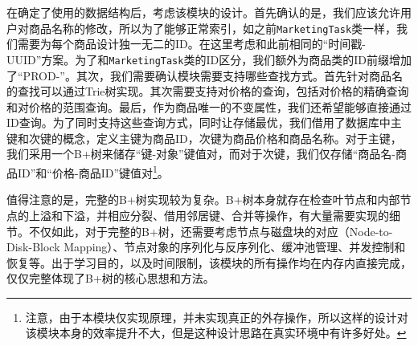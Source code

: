 \documentclass[cn,hazy,blue,10pt,normal]{elegantnote}
\begin{document}
在确定了使用的数据结构后，考虑该模块的设计。首先确认的是，我们应该允许用户对商品名称的修改，所以为了能够正常索引，如之前\texttt{MarketingTask}类一样，我们需要为每个商品设计独一无二的ID。在这里考虑和此前相同的“时间戳-UUID”方案。为了和\texttt{MarketingTask}类的ID区分，我们额外为商品类的ID前缀增加了“PROD-”。其次，我们需要确认模块需要支持哪些查找方式。首先针对商品名的查找可以通过Trie树实现。其次需要支持对价格的查询，包括对价格的精确查询和对价格的范围查询。最后，作为商品唯一的不变属性，我们还希望能够直接通过ID查询。为了同时支持这些查询方式，同时让存储最优，我们借用了数据库中主键和次键的概念，定义主键为商品ID，次键为商品价格和商品名称。对于主键，我们采用一个B+树来储存“键-对象”键值对，而对于次键，我们仅存储“商品名-商品ID”和“价格-商品ID”键值对\footnote{注意，由于本模块仅实现原理，并未实现真正的外存操作，所以这样的设计对该模块本身的效率提升不大，但是这种设计思路在真实环境中有许多好处。}。

值得注意的是，完整的B+树实现较为复杂。B+树本身就存在检查叶节点和内部节点的上溢和下溢，并相应分裂、借用邻居键、合并等操作，有大量需要实现的细节。不仅如此，对于完整的B+树，还需要考虑节点与磁盘块的对应（Node-to-Disk-Block Mapping）、节点对象的序列化与反序列化、缓冲池管理、并发控制和恢复等。出于学习目的，以及时间限制，该模块的所有操作均在内存内直接完成，仅仅完整体现了B+树的核心思想和方法。
\end{document}
